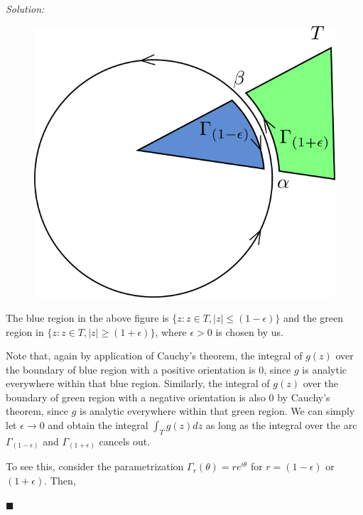 \documentclass[12pt]{article}
\theoremstyle{definition}
\newenvironment{answer}{\textit{Solution: }\quad }{ \hfill $\blacksquare$}
\numberwithin{equation}{section}
\begin{document}
\begin{answer}
\begin{enumerate}
\begin{enumerate}
			\begin{figure}[h]
				\centering
				\includegraphics[width = 0.5\linewidth]{circle-arc.png}
			\end{figure}

			The blue region in the above figure is $\{ z : z\in T , \vert z \vert \leq (1- \epsilon) \}$ and the green region in $\{ z : z \in T, \vert z \vert \geq (1 + \epsilon) \}$, where $\epsilon > 0$ is chosen by us.

			Note that, again by application of Cauchy's theorem, the integral of $g(z)$ over the boundary of blue region with a positive orientation is $0$, since $g$ is analytic everywhere within that blue region. Similarly, the integral of $g(z)$ over the boundary of green region with a negative orientation is also $0$ by Cauchy's theorem, since $g$ is analytic everywhere within that green region. We can simply let $\epsilon \rightarrow 0$ and obtain the integral $\int_T g(z)dz$ as long as the integral over the arc $\Gamma_{(1 -\epsilon)}$ and $\Gamma_{(1 + \epsilon)}$ cancels out.

			To see this, consider the parametrization $\Gamma_r(\theta) = r e^{i\theta}$ for $r = (1-\epsilon)$ or $(1 + \epsilon)$. Then,


\end{enumerate}
\end{enumerate}
\end{answer}
\end{document}
